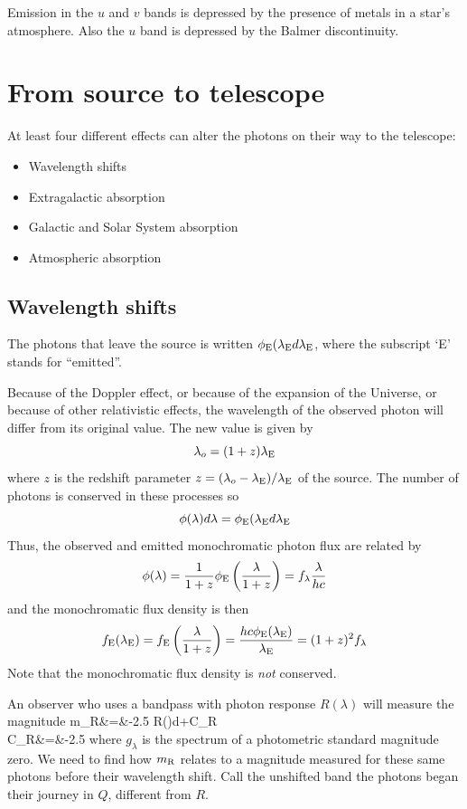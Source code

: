 Emission in the $u$ and $v$ bands is depressed by the presence of
metals in a star's atmosphere. Also the $u$ band is depressed by the
Balmer discontinuity. 

\section{From source to telescope}
At least four different effects can alter the photons on their way to
the telescope:
\begin{itemize}
\item Wavelength shifts
\item Extragalactic absorption
\item Galactic and Solar System absorption
\item Atmospheric absorption
\end{itemize}
\subsection{Wavelength shifts}
The photons that leave the source is written $\phi_{\rm
  E}(\lambda_{\rm E}d\lambda_{\rm E}$, where the subscript `E' stands
for ``emitted''. 

Because of the Doppler effect, or because of the expansion of the
Universe, or because of other relativistic effects, the wavelength of
the observed photon will differ from its original value. The new value
is given by
\[
\lambda_o=(1+z)\lambda_{\rm E}
\]
where $z$ is the redshift parameter $z={(\lambda_o-\lambda_{\rm
  E})/\lambda_{\rm E}}$ of the source. The number of photons is
conserved in these processes so 
\[
\phi(\lambda)d\lambda=\phi_{\rm E}(\lambda_{\rm E}d\lambda_{\rm E}
\]
Thus, the observed and emitted monochromatic photon flux are related by 
\[
\phi(\lambda)=\frac{1}{1+z}\phi_{\rm E}\left(\frac{\lambda}{1+z}\right)=f_\lambda\frac{\lambda}{hc}
\]
and the monochromatic flux density is then
\[
f_{\rm E}(\lambda_{\rm E})=f_{\rm
  E}\left(\frac{\lambda}{1+z}\right)=\frac{hc\phi_{\rm E}(\lambda_{\rm
    E})}{\lambda_{\rm E}}=(1+z)^2f_\lambda
\]
Note that the monochromatic flux density is {\it not} conserved.

An observer who uses a bandpass with photon response $R(\lambda)$ will
measure the magnitude
\bua
m_{\rm R}&=&-2.5\log
{ \int R(\lambda)\frac{\phi(\lambda)}{\lambda}d\lambda}+C_{\rm R} \\
C_{\rm R}&=&-2.5
\eua
where $g_\lambda$ is the spectrum of a photometric standard magnitude
zero. We need to find how $m_{\rm R}$ relates to a magnitude measured
for these same photons before their wavelength shift. Call the
unshifted band the photons began their journey in $Q$, different from $R$.

